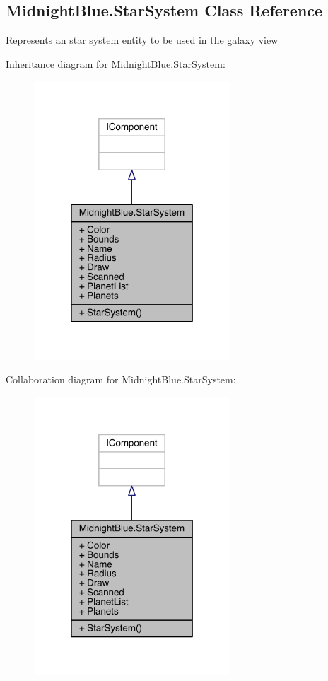 \hypertarget{class_midnight_blue_1_1_star_system}{}\subsection{Midnight\+Blue.\+Star\+System Class Reference}
\label{class_midnight_blue_1_1_star_system}


Represents an star system entity to be used in the galaxy view  




Inheritance diagram for Midnight\+Blue.\+Star\+System\+:\nopagebreak
\begin{figure}[H]
\begin{center}
\leavevmode
\includegraphics[width=208pt]{class_midnight_blue_1_1_star_system__inherit__graph}
\end{center}
\end{figure}


Collaboration diagram for Midnight\+Blue.\+Star\+System\+:\nopagebreak
\begin{figure}[H]
\begin{center}
\leavevmode
\includegraphics[width=208pt]{class_midnight_blue_1_1_star_system__coll__graph}
\end{center}
\end{figure}
